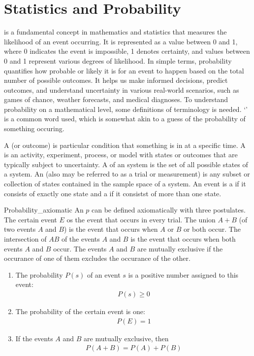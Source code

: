\chapter{Statistics and Probability}
\thispagestyle{fancy}

 is a fundamental concept in mathematics and statistics that measures the likelihood of an event occurring. It is represented as a value between 0 and 1, where 0 indicates the event is impossible, 1 denotes certainty, and values between 0 and 1 represent various degrees of likelihood. In simple terms, probability quantifies how probable or likely it is for an event to happen based on the total number of possible outcomes. It helps us make informed decisions, predict outcomes, and understand uncertainty in various real-world scenarios, such as games of chance, weather forecasts, and medical diagnoses. To understand probability on a mathematical level, some definitions of terminology is needed. `' is a common word used, which is somewhat akin to a guess of the probability of something occuring.

A  (or outcome) is particular condition that something is in at a specific time. A  is an activity, experiment, process, or model with states or outcomes that are typically subject to uncertainty. A  of an system is the set of all possible states of a system. An  (also may be referred to as a trial or measurement) is any subset or collection of states contained in the sample space of a system. An event is a  if it consists of exactly one state and a  if it consistst of more than one state.

\begin{defn}{Probability_axiomatic}
An  $p$ can be defined axiomatically with three postulates. The certain event $E$ os the event that occurs in every trial. The union $A+B$ (of two events $A$ and $B$) is the event that occurs when $A$ or $B$ or both occur. The intersection of $AB$ of the events $A$ and $B$ is the event that occurs when both events $A$ and $B$ occur. The events $A$ and $B$ are mutually exclusive if the occurance of one of them excludes the occurance of the other. 
\begin{enumerate}
\item The probability $P(s)$ of an event $s$ is a positive number assigned to this event:
	\begin{align}
	P(s) \geq 0
	\end{align}
 \item The probability of the certain event is one:
	\begin{align}
	P(E) =1
	\end{align}
  \item If the events $A$ and $B$ are mutually exclusive, then 
	\begin{align}
	P(A+B) = P(A) + P(B)
	\end{align}
\end{enumerate}
\end{defn}

